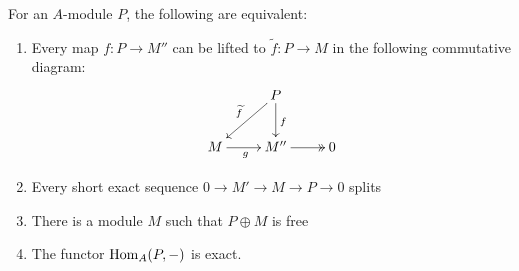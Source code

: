 \begin{theorem}
    For an $A$-module $P$, the following are equivalent: 
    \begin{enumerate}[label=(\alph*)]
    \item Every map $f: P\to M''$ can be lifted to $\widetilde{f}: P\to M$ in the following commutative diagram: 
    \begin{equation*}
    \xymatrix{
        & P\ar[ld]_{\widetilde f}\ar[d]^f & \\
        M\ar[r]_g & M''\ar@{->>}[r] & 0
    }
    \end{equation*}
    \item Every short exact sequence $0\rightarrow M'\rightarrow M\rightarrow P\rightarrow 0$ splits 
    \item There is a module $M$ such that $P\oplus M$ is free 
    \item The functor $\operatorname{Hom}_A(P,-)$ is exact.
    \end{enumerate}
\end{theorem}
